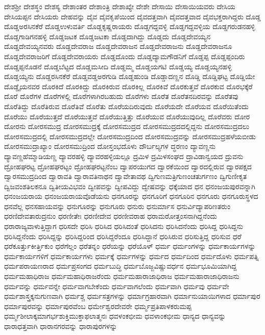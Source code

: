 {ದೇಶಶ್ರೀ
ದೇಶಸ್ಥಂ
ದೇಶಸ್ಯ
ದೇಶಾಂತರ
ದೇಶಾಂತ್ರಿ
ದೇಶಾಖ್ಯೇ
ದೇಶೇ
ದೇಸಾಯಿ
ದೇಸಾಯಿಯವರು
ದೇಸಿಯ
ದೇಸಿಯಪ್ಪನ
ದೇಸಿಯರು
ದೇಹವನ್ನು
ದೈವ
ದೈವಕೃಪೆಯಿಂದ
ದೈವದತ್ತವಾಗಿ
ದೈವದತ್ತವಾದ
ದೈವಭಕ್ತರಾಗಿದ್ದರು
ದೊಡ್ಡ
ದೊಡ್ಡಅರಸಿನಕೆರೆ
ದೊಡ್ಡಉಳುವರ್ತಿ
ದೊಡ್ಡಕೃಷ್ಣರಾಯರು
ದೊಡ್ಡಗದ್ದವಳ್ಳಿ
ದೊಡ್ಡಗದ್ದವಳ್ಳಿಯ
ದೊಡ್ಡಗರುಡನಹಳ್ಳಿ
ದೊಡ್ಡಗಾಡಿಗನಹಳ್ಳಿ
ದೊಡ್ಡಜಟಕ
ದೊಡ್ಡಜಟಕಾ
ದೊಡ್ಡದಾಗಿದ್ದು
ದೊಡ್ಡದು
ದೊಡ್ಡದೇವಯ್ಯನ
ದೊಡ್ಡದೇವಯ್ಯನವರು
ದೊಡ್ಡದೇವರಾಜ
ದೊಡ್ಡದೇವರಾಜನ
ದೊಡ್ಡದೇವರಾಜನು
ದೊಡ್ಡದೇವರಾಜನೂ
ದೊಡ್ಡದೇವರಾಜರಿಗೆ
ದೊಡ್ಡದೇವರಾಯರು
ದೊಡ್ಡದೊಂದು
ದೊಡ್ಡದ್ಯಾಮಗೌಡನಿಗೆ
ದೊಡ್ಡಪ್ಪ
ದೊಡ್ಡಪ್ಪಂದಿರು
ದೊಡ್ಡಪ್ಪನೊಡನೆ
ದೊಡ್ಡಬೆಟ್ಟದ
ದೊಡ್ಡಮಸೀದಿ
ದೊಡ್ಡಮ್ಮ
ದೊಡ್ಡಯಗಟಿ
ದೊಡ್ಡಯ್ಯ
ದೊಡ್ಡಯ್ಯನಹಳ್ಳಿ
ದೊಡ್ಡಯ್ಯನು
ದೊಡ್ಡರಸಿನಕೆರೆ
ದೊಡ್ಡವಡ್ಡಅರಗುಡಿ
ದೊಡ್ಡಹುಂಡಿ
ದೊಡ್ಡಾದಣ್ಣನ
ದೊಡ್ಡಿ
ದೊಡ್ಡಿಘಟ್ಟ
ದೊಡ್ಡಿಯೇ
ದೊಡ್ಡೈಯನವರ
ದೊರಕಿದೆ
ದೊರಕಿದ್ದು
ದೊರಕಿರುವ
ದೊರಕಿಲ್ಲ
ದೊರಕಿವೆ
ದೊರಕುತ್ತವೆ
ದೊರಕುವ
ದೊರಭಕ್ಕೆರೆ
ದೊರೆ
ದೊರೆಗಳ
ದೊರೆಗಳಲ್ಲಿ
ದೊರೆಗಳಾಗಿರಬಹುದು
ದೊರೆಗಳು
ದೊರೆತ
ದೊರೆತನದಿರವನ್ನು
ದೊರೆತವು
ದೊರೆತಿದ್ದು
ದೊರೆತಿರುವ
ದೊರೆತಿವೆ
ದೊರೆತು
ದೊರೆಯದಿರುವುದು
ದೊರೆಯದೇ
ದೊರೆಯವ
ದೊರೆಯಿತೆಂದು
ದೊರೆಯು
ದೊರೆಯುತ್ತದೆ
ದೊರೆಯುತ್ತವೆ
ದೊರೆಯುತ್ತಿತ್ತು
ದೊರೆಯುವ
ದೊರೆಯುವುದಿಲ್ಲ
ದೊರೆವರು
ದೋರ
ದೋರನು
ದೋರಸಮುದ್ರ
ದೋರಸಮುದ್ರಕ್ಕೆ
ದೋರಸಮುದ್ರದ
ದೋರಸಮುದ್ರದದಲ್ಲಿದ್ದನು
ದೋರಸಮುದ್ರದಲು
ದೋರಸಮುದ್ರದಲ್ಲಿ
ದೋರಸಮುದ್ರದಲ್ಲೇ
ದೋರಸಮುದ್ರದಿಂದ
ದೋರಸಮುದ್ರವನ್ನು
ದೋರಸಮುದ್ರಹಳೆಯಬೀಡು
ದೋರಸಮುದ್ರಾಖ್ಯಾಂ
ದೋರಸಮುದ್ರಿಂದ
ದೋಸ್ತಂಭದೊಳು
ದೌರ್ಬಲ್ಯಗಳ
ದ್ಧರಣಂ
ದ್ಯಾವಣ್ಣನು
ದ್ಯಾವಣ್ಣಹೆಮ್ಮಾಡಿಯಣ್ಣ
ದ್ಯಾವರಹಳ್ಳಿ
ದ್ಯಾವರಹಳ್ಳಿಯಲ್ಲೂ
ದ್ರಮಿಳ
ದ್ರಮಿಳಸಂಘದ
ದ್ರಾವಿಡಾನ್ವಯದ
ದ್ರುವನು
ದ್ರೋಹಘರಟ್ಟ
ದ್ರೋಹಘರಟ್ಟಂ
ದ್ರೋಹಘರಟ್ಟನೆಂಬ
ದ್ವಾಪರಯುಗದ
ದ್ವಾರಕೆಯಿಂದ
ದ್ವಾರದಲ್ಲಿರುವ
ದ್ವಾರಪಕ್ಷದ
ದ್ವಾರಸಮುದ್ರದಿಂದ
ದ್ವಾರಾವತಿ
ದ್ವಾರಾವತಿನಾಥನ
ದ್ವಾವೇತಾವಥ
ದ್ವಿಗುಣಮತ್ರಿಗುಣಂಚತುರ್ಗಣಂ
ದ್ವಿಗುಣೀಕೃತ
ದ್ವಿಜವಂಶತಿಲಕನೂ
ದ್ವಿತೀಯವಿಭವಂ
ದ್ವೀಪವನ್ನು
ದ್ವೀಪವಿದ್ದು
ದ್ವೇಷವನ್ನು
ಧಕ್ಕೆಯಾದ
ಧನ
ಧನಂಜಯಪುರವನ್ನಾಗಿ
ಧನಂಜಯರಾಯ
ಧನಂಜಯರಾಯವೊಡೆಯನು
ಧನಗೂರನ್ನು
ಧನಗೂರಿಗೆ
ಧನಗೂರಿನ
ಧನಗೂರು
ಧನಗೂರುಸ್ಥಳದ
ಧನವೆಲ್ಲ
ಧನಸಹಾಯವನ್ನು
ಧನುಗೂರನ್ನು
ಧನುಗೂರು
ಧನುರು
ಧನುರ್ಮಾಸ
ಧನುರ್ವಿದ್ಯಾಪರಿಣತರುಂ
ಧರಣಿದೇವತಾರುದ್ರನುಂ
ಧರಣೀತೇಃ
ಧರಣೀದೇವ
ಧರಣೀವರಾಹ
ಧರಾಮರೋತ್ತಂಸನಾಗಿದ್ದನೆಂದು
ಧರಾರಾಜ್ಯವಾಳುತ್ತಿದ್ದಾಗ
ಧರಿಸದೇ
ಧರಿಸಿ
ಧರಿಸಿದ
ಧರಿಸಿದಂತೆ
ಧರಿಸಿದನು
ಧರಿಸಿದನೆಂದು
ಧರಿಸಿದ್ದ
ಧರಿಸಿದ್ದನು
ಧರಿಸಿದ್ದನೆಂದು
ಧರಿಸಿದ್ದನ್ನು
ಧರಿಸಿದ್ದರಿಂದ
ಧರಿಸಿದ್ದರೆಂದೂ
ಧರಿಸಿದ್ದಾನೆ
ಧರಿಸಿರುವ
ಧರಿಸುತ್ತಿದ್ದ
ಧರಿಸುವ
ಧರೆ
ಧರೆಕೂರ್ತ್ತುಕೀರ್ತ್ತಿಕುಂ
ಧರೆಗೆಲ್ಲಂ
ಧರೆತನ್ನಂ
ಧರೆಯನ್ನು
ಧರೆಯೊಳ್
ಧರ್ಮ
ಧರ್ಮಂಗಳನ್ನು
ಧರ್ಮಕಾರ್ಯಗಳನ್ನು
ಧರ್ಮಕಾರ್ಯಗಳಿಗೆ
ಧರ್ಮಕಾರ್ಯಗಳು
ಧರ್ಮಕ್ಕೆ
ಧರ್ಮಗಳನ್ನು
ಧರ್ಮದ
ಧರ್ಮದಿಂದ
ಧರ್ಮದೊಳು
ಧರ್ಮಪತ್ನಿ
ಧರ್ಮಪರಾಯಣರಾದ
ಧರ್ಮಪ್ರಸಂಗದ
ಧರ್ಮಬುದ್ಧಿ
ಧರ್ಮಬೊಜ್ಜವಿಷ್ಣುವರ್ಧನ
ಧರ್ಮಭೂಮಿಯಾಗಿದ್ದ
ಧರ್ಮಮಹಾಧಿರಾಜ
ಧರ್ಮಮಹಾಧಿರಾಜರೆಂದು
ಧರ್ಮಮಹಾರಾಜಾಧಿರಾಜ
ಧರ್ಮಮಹಾರಾಜಾಧಿರಾಜನು
ಧರ್ಮವನ್ನು
ಧರ್ಮವನ್ನೇ
ಧರ್ಮವಾಗಬೇಕೆಂದು
ಧರ್ಮವಾಗಲೆಂದು
ಧರ್ಮವಾಗಿ
ಧರ್ಮವು
ಧರ್ಮವೇ
ಧರ್ಮಶಾಸ್ತ್ರಕ್ಕನುಗುಣವಾಗಿ
ಧರ್ಮಶ್ಚ
ಧರ್ಮಸತ್ರಗಳನ್ನು
ಧರ್ಮಾಗ್ರಹಾರವಾಗಿ
ಧರ್ಮಾನುಯಾಯಿಗಳಾದ
ಧರ್ಮಾಪುರ
ಧರ್ಮಾಪುರವನ್ನು
ಧರ್ಮಾಪುರವೆಂಬ
ಧರ್ಮೇಶ್ವರದೇವರೇ
ಧರ್ಮ್ಮಪ್ರತಿಪಾಳಕರುಮಪ್ಪ
ಧರ್ಮ್ಮಶೀಲಾಕ್ಕಮಾಗರ್ಭಶುಕ್ತಿಮುಕ್ತಾಫಲಾತ್ಮನಃ
ಧವಳಂಕಭೀಮ
ಧವಳಾಂಕಭೀಮ
ಧಾನ್ಯದ
ಧಾನ್ಯವನ್ನು
ಧಾರಾಧತ್ತವಾಗಿ
ಧಾರಾನಗರವನ್ನು
ಧಾರಾಪುರಗಳನ್ನು
}
